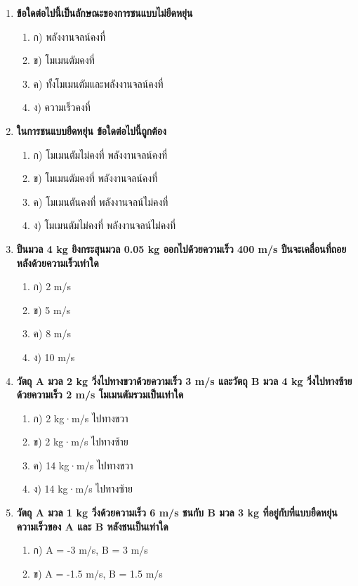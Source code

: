 \documentclass[12pt]{article}
\begin{document}
\begin{enumerate}
\begin{enumerate}
\item ค) 120 N
\item ง) 160 N
\end{enumerate}
\item \textbf{ข้อใดต่อไปนี้เป็นลักษณะของการชนแบบไม่ยืดหยุ่น}
\begin{enumerate}
\item ก) พลังงานจลน์คงที่
\item ข) โมเมนตัมคงที่
\item ค) ทั้งโมเมนตัมและพลังงานจลน์คงที่
\item ง) ความเร็วคงที่
\end{enumerate}
\item \textbf{ในการชนแบบยืดหยุ่น ข้อใดต่อไปนี้ถูกต้อง}
\begin{enumerate}
\item ก) โมเมนตัมไม่คงที่ พลังงานจลน์คงที่
\item ข) โมเมนตัมคงที่ พลังงานจลน์คงที่
\item ค) โมเมนตันคงที่ พลังงานจลน์ไม่คงที่
\item ง) โมเมนตัมไม่คงที่ พลังงานจลน์ไม่คงที่
\end{enumerate}
\item \textbf{ปืนมวล 4 kg ยิงกระสุนมวล 0.05 kg ออกไปด้วยความเร็ว 400 m/s ปืนจะเคลื่อนที่ถอยหลังด้วยความเร็วเท่าใด}
\begin{enumerate}
\item ก) 2 m/s
\item ข) 5 m/s
\item ค) 8 m/s
\item ง) 10 m/s
\end{enumerate}
\item \textbf{วัตถุ A มวล 2 kg วิ่งไปทางขวาด้วยความเร็ว 3 m/s และวัตถุ B มวล 4 kg วิ่งไปทางซ้ายด้วยความเร็ว 2 m/s โมเมนตัมรวมเป็นเท่าใด}
\begin{enumerate}
\item ก) 2 kg·m/s ไปทางขวา
\item ข) 2 kg·m/s ไปทางซ้าย
\item ค) 14 kg·m/s ไปทางขวา
\item ง) 14 kg·m/s ไปทางซ้าย
\end{enumerate}
\item \textbf{วัตถุ A มวล 1 kg วิ่งด้วยความเร็ว 6 m/s ชนกับ B มวล 3 kg ที่อยู่กับที่แบบยืดหยุ่น ความเร็วของ A และ B หลังชนเป็นเท่าใด}
\begin{enumerate}
\item ก) A = -3 m/s, B = 3 m/s
\item ข) A = -1.5 m/s, B = 1.5 m/s

\end{enumerate}
\end{enumerate}
\end{document}
